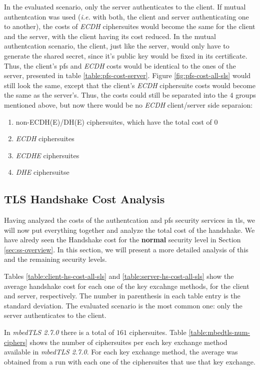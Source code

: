 \documentclass{llncs}
\begin{document}
In the evaluated scenario, only the server authenticates to the client. If mutual authentcation was used (\textit{i.e.} with both, the client 
and server authenticating one to another), the costs of \textit{ECDH} ciphersuites would become the same for the client and the server, with the client
having its cost reduced. In the mutual authentcation scenario, the client, just like the server, would only have to generate the shared secret, since
it's public key would be fixed in its certificate. Thus, the client's \gls{pfs} and \textit{ECDH} costs would be identical to the ones of the server,
presented in table \ref{table:pfs-cost-server}. Figure \ref{fig:pfs-cost-all-sls} would still look the same, except that the client's \textit{ECDH}
ciphersuite costs would become the same as the server's. Thus, the costs could still be separated into the $4$ groups mentioned above, 
but now there would be no \textit{ECDH} client/server side separaion:

\begin{enumerate}
  \item non-ECDH(E)/DH(E) ciphersuites, which have the total cost of $0$
  \item \textit{ECDH} ciphersuites
  \item \textit{ECDHE} ciphersuites
  \item \textit{DHE} ciphersuitse
\end{enumerate}

\subsection{TLS Handshake Cost Analysis} \label{sec:tls-hs-cost}

Having analyzed the costs of the authentcation and \gls{pfs} security services in \gls{tls}, we will now put everything together and
analyze the total cost of the handshake. We have alredy seen the Handshake cost for the \textbf{normal} security level in
Section \ref{sec:ss-overview}. In this section, we will present a more detailed analysis of this and the remaining security levels.

Tables \ref{table:client-hs-cost-all-sls} and \ref{table:server-hs-cost-all-sls} show the average handshake cost for each one of the
key excahnge methods, for the client and server, respectively. The number in parenthesis in each table entry is the standard deviation.
The evaluated scenario is the most common one: only the server authenticates to the client.

In \textit{mbedTLS 2.7.0} there is a total of $161$ ciphersuites. Table \ref{table:mbedtls-num-ciphers} shows the number of 
ciphersuites per each key exchange method available in \textit{mbedTLS 2.7.0}. For each key exchange method, the average was obtained 
from a run with each one of the ciphersuites that use that key exchange.
\end{document}
